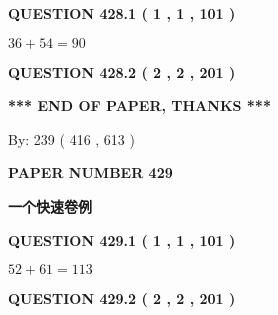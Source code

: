 \documentclass{ctexart}
\begin{document}
   
  
\vspace{0.2in}
  
{\textbf{\Large{QUESTION
428.1 
 ( 1 , 1 , 101 )
}}}
  
  
 
 

$ %
36 +  %
54=   %
90$
 
 
  
\vspace{0.2in}
  
{\textbf{\Large{QUESTION
428.2 
 ( 2 , 2 , 201 )
}}}
  
  
   
   
 \vspace{0.2in}
 
   
   
   
   
\vspace{1.0in} 
{\textbf{\large{ *** END OF PAPER, THANKS *** }}} 
   
   
\hspace{1.0in} By: 
 239 ( 416 ,  613 )
   
   
   
   
\newpage 
\setcounter{page}{ 
   429001 } 
   
   
   
   
 {\textbf{ \Large{ PAPER NUMBER  429  }}}
   
   
\vspace{0.2in}
   
   
   
   
   
   
 \vspace{0.2in}
{\LARGE {\textbf{ 一个快速卷例}}}
   
   
  
\vspace{0.2in}
  
{\textbf{\Large{QUESTION
429.1 
 ( 1 , 1 , 101 )
}}}
  
  
 
 

$ %
52 +  %
61=   %
113$
 
 
  
\vspace{0.2in}
  
{\textbf{\Large{QUESTION
429.2 
 ( 2 , 2 , 201 )
}}}
  
  
   
\end{document}
